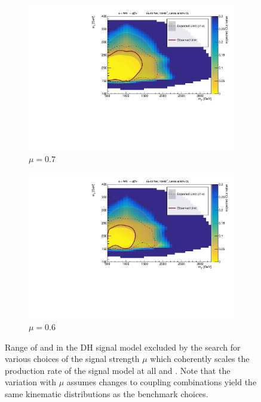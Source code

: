 \begin{figure}[h]
\begin{subfigure}{0.48\textwidth}
    \includegraphics[width=\textwidth]{Figures/App_signal_strength/unblinded_mu0_7_nosig.pdf}
    \caption{\(\mu=0.7\)}\label{fig:unblinded_0.7}
  \end{subfigure} \hspace{0.3em}
  \begin{subfigure}{0.48\textwidth}
    \includegraphics[width=\textwidth]{Figures/App_signal_strength/unblinded_mu0_6_nosig.pdf}
    \caption{\(\mu=0.6\)}\label{fig:unblinded_0.6}
  \end{subfigure}
  \caption[]{Range of \ms and \mZp in the DH signal model excluded by the search for various choices of the signal strength \(\mu\) which coherently scales the production rate of the signal model at all \ms and \mZp. Note that the variation with \(\mu\) assumes changes to coupling combinations yield the same kinematic distributions as the benchmark choices.}
  \label{fig:limits_vary_mu_sig}
\end{figure}
